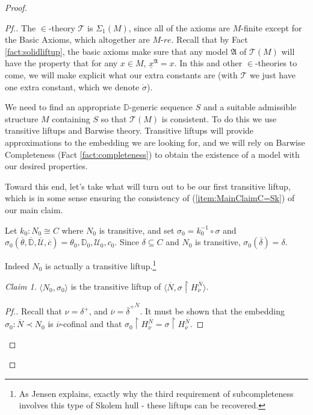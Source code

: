 \documentclass{amsart}
\theoremstyle{definition}
\theoremstyle{remark}
\newtheorem{claimno}{Claim}
\newcommand{\D}{\mathbb{D}}
\newcommand{\N}{{\overline{N}}}
\newcommand{\U}{\mathcal{U}}
\begin{document}
\begin{proof}
\begin{proof}[Pf.]
The $\in$-theory $\mathcal T$ is $\Sigma_1(M)$, since all of the axioms are $M$-finite except for the \textsf{Basic Axioms}, which altogether are $M$-$re$. Recall that by Fact \ref{fact:solidliftup}, the basic axioms make sure that any model $\mathfrak A$ of $\mathcal T(M)$ will have the property that for any $x \in M$, $\underline x^{\mathfrak A}=x$. In this and other $\in$-theories to come, we will make explicit what our extra constants are (with $\mathcal T$ we just have one extra constant, which we denote $\dot \sigma$).

We need to find an appropriate $\D$-generic sequence $S$ and a suitable admissible structure $M$ containing $S$ so that $\mathcal T(M)$ is consistent. To do this we use transitive liftups and Barwise theory. Transitive liftups will provide approximations to the embedding we are looking for, and we will rely on Barwise Completeness (Fact \ref{fact:completeness}) to obtain the existence of a model with our desired properties. 

Toward this end, let's take what will turn out to be our first transitive liftup, which is in some sense ensuring the consistency of (\ref{item:MainClaimC=Sk}) of our main claim.

Let $k_0 : N_0 \cong C$ where $N_0$ is transitive, and set $\sigma_0 = k_0^{-1} \circ \sigma$ and $\sigma_0(\overline \theta, \overline{\D}, \overline{\U}, \overline c) = \theta_0, \D_0, \U_0, c_0.$
Since $\delta \subseteq C$ and $N_0$ is transitive, $\sigma_0(\overline \delta)=\delta$. 

Indeed $N_0$ is actually a transitive liftup.\footnote{As Jensen {\cite[Lemma 5.3]{Jensen:2014}} explains, exactly why the third requirement of subcompleteness involves this type of Skolem hull - these liftups can be recovered.}

\begin{claimno} \label{claim:N0isliftupofN} $\langle N_0, \sigma_0 \rangle$ is the transitive liftup of $\langle \N, \sigma \upharpoonright H_{\overline \nu}^{\N} \rangle$. \end{claimno}
\begin{proof}[Pf.] Recall that $\nu=\delta^+$, and $\overline \nu={\overline \delta^+}^{\N}$. It must be shown that the embedding $\sigma_0: \overline N \prec N_0$ is $\overline \nu$-cofinal and that $\sigma_0 \upharpoonright H_{\overline \nu}^{\N}=\sigma \upharpoonright H_{\overline \nu}^{\overline N}$. 


\end{proof}
\end{proof}
\end{proof}
\end{document}

